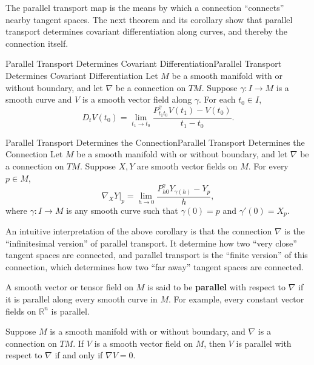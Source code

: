\documentclass[../main.tex]{subfiles}
\begin{document}
\begin{remark}
	The parallel transport map is the means by which a connection ``connects'' nearby tangent spaces. The next theorem and its corollary show that parallel transport determines covariant differentiation along curves, and thereby the connection itself.
\end{remark}

\begin{theorem}{Parallel Transport Determines Covariant Differentiation}{Parallel Transport Determines Covariant Differentiation}
	Let $M$ be a smooth manifold with or without boundary, and let $\nabla$ be a connection on $TM$. Suppose $\gamma:I\to M$ is a smooth curve and $V$ is a smooth vector field along $\gamma$. For each $t_0\in I$,
	\begin{equation}
		D_tV(t_0) =	\lim_{t_1\to t_0}	\frac{P^\gamma_{t_1t_0}V(t_1)-V(t_0)}{t_1-t_0}.
	\end{equation}
\end{theorem}

\begin{corollary}{Parallel Transport Determines the Connection}{Parallel Transport Determines the Connection}
	Let $M$ be a smooth manifold with or without boundary, and let $\nabla$ be a connection on $TM$. Suppose $X,Y$ are smooth vector fields on $M$. For every $p\in M$,
	\begin{equation}
		\left.\nabla_XY\right|_p = \lim_{h\to0} 		\frac{P^\gamma_{h0}Y_{\gamma(h)}-Y_p}{h},
	\end{equation}
	where $\gamma:I\to M$ is any smooth curve such that $\gamma(0)=p$ and $\gamma'(0)=X_p$.
\end{corollary}

\begin{remark}
	An intuitive interpretation of the above corollary is that the connection $\nabla$ is the ``infinitesimal version'' of parallel transport. It determine how two ``very close'' tangent spaces are connected, and parallel transport is the ``finite version'' of this connection, which determines how two ``far away'' tangent spaces are connected.
\end{remark}

A smooth vector or tensor field on $M$ is said to be \textbf{parallel} with respect to $\nabla$ if it is parallel along every smooth curve in $M$. For example, every constant vector fields on $\mathbb{R}^n$ is parallel.

\begin{proposition}{}{}
	Suppose $M$ is a smooth manifold with or without boundary, and $\nabla$ is a connection on $TM$. If $V$ is a smooth vector field on $M$, then $V$ is parallel with respect to $\nabla$ if and only if $\nabla V = 0$.
\end{proposition}
\end{document}

